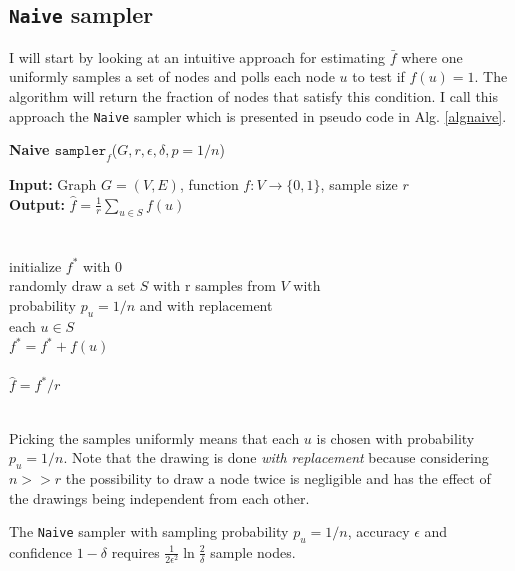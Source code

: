 \subsection{\texttt{Naive} sampler}
I will start by looking at an intuitive approach for estimating $\bar{f}$ where one uniformly samples a set of nodes and polls each node $u$ to test if $f(u)=1$.
The algorithm will return the fraction of nodes that satisfy this condition. I call this approach the \texttt{Naive} sampler which is presented in pseudo code in Alg. \ref{algnaive}.

\begin{algorithm*}[!htb]
  \caption{\small {\bf Naive $\texttt{sampler}_f$}($G, r, \epsilon, \delta, p = 1/n$)}
  \begin{code}
  {\bf Input:} Graph $G=(V,E)$, function $f : V \rightarrow \{0,1\}$, sample size $r$ \\
  {\bf Output:} $\hat{f}=\frac{1}{r}\sum\nolimits_{u\in S} f(u)$\\
  \\
  \uln \>\ubegin\\
  \uln \>\>initialize $f^*$ with 0 \\
  \uln \>\>randomly draw a set $S$ with r samples from $V$ with\\
  \>\>\>\>probability $p_u = 1/n$ and with replacement\\
  \uln \>\>\ufor each $u \in S$ \udo\\
  \uln \>\>\>$f^* = f^* + f(u)$ \\
  \uln \>\>\uend\\
  \uln \>\ureturn $\hat{f} = f^*/r$ \\
  \uln \>\uend\\ 
  \end{code}
  \label{algnaive}
\end{algorithm*}
Picking the samples uniformly means that each $u$ is chosen with probability $p_u = 1/n$. Note that the drawing is done \textit{with replacement} because considering $n >> r$ the possibility to draw a node twice is negligible and has the effect of the drawings being independent from each other.
\begin{theorem}
\label{samplingtheorem}
  The \texttt{Naive} sampler with sampling probability $p_u = 1/n$, accuracy $\epsilon$ and confidence $1-\delta$ requires $\frac{1}{2\epsilon^2}\ln{\frac{2}{\delta}}$ sample nodes.
\end{theorem}
